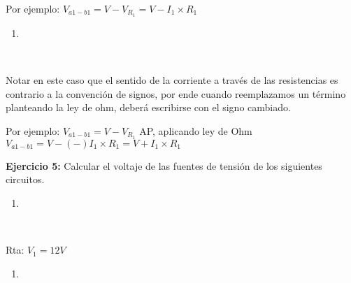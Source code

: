 \documentclass[11pt]{article}
\providecommand{\tightlist}{%
      \setlength{\itemsep}{0pt}\setlength{\parskip}{0pt}}
\begin{document}
    Por ejemplo: \(V_{a1-b1}=V-V_{R_1}=V-I_1 \times R_1\)

    \begin{enumerate}
\def\labelenumi{\alph{enumi})}
\setcounter{enumi}{1}
\tightlist
\item
\end{enumerate}

    \begin{center}
    \end{center}
    { \hspace*{\fill} \\}
    
    Notar en este caso que el sentido de la corriente a través de las
resistencias es contrario a la convención de signos, por ende cuando
reemplazamos un término planteando la ley de ohm, deberá escribirse con
el signo cambiado.

Por ejemplo: \(V_{a1-b1}=V-V_{R_1}\) AP, aplicando ley de Ohm
\(V_{a1-b1}=V-(-)I_1 \times R_1=V+I_1 \times R_1\)

    \textbf{Ejercicio 5:} Calcular el voltaje de las fuentes de tensión de
los siguientes circuitos.

\begin{enumerate}
\def\labelenumi{\alph{enumi})}
\tightlist
\item
\end{enumerate}

    \begin{center}
    \end{center}
    { \hspace*{\fill} \\}
    
    Rta: \(V_1=12V\)

\begin{enumerate}
\def\labelenumi{\alph{enumi})}
\setcounter{enumi}{1}
\tightlist
\item
\end{enumerate}

    \begin{center}
    \end{center}
    { \hspace*{\fill} \\}
    
\end{document}
